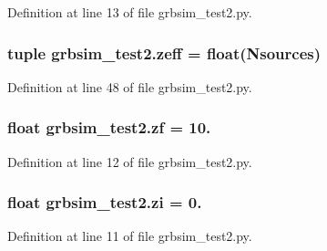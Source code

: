 Definition at line 13 of file grbsim\-\_\-test2.\-py.

\hypertarget{namespacegrbsim__test2_a13b835692fda0f61664fe2b3c0f326da}{
\subsubsection[{zeff}]{\setlength{\rightskip}{0pt plus 5cm}tuple grbsim\-\_\-test2.\-zeff = float({\bf Nsources})}}\label{namespacegrbsim__test2_a13b835692fda0f61664fe2b3c0f326da}


Definition at line 48 of file grbsim\-\_\-test2.\-py.

\hypertarget{namespacegrbsim__test2_a29713267fce8abc775a28c327915dede}{
\subsubsection[{zf}]{\setlength{\rightskip}{0pt plus 5cm}float grbsim\-\_\-test2.\-zf = 10.}}\label{namespacegrbsim__test2_a29713267fce8abc775a28c327915dede}


Definition at line 12 of file grbsim\-\_\-test2.\-py.

\hypertarget{namespacegrbsim__test2_a26f247fca7a995a7a7aa66713bf68ceb}{
\subsubsection[{zi}]{\setlength{\rightskip}{0pt plus 5cm}float grbsim\-\_\-test2.\-zi = 0.}}\label{namespacegrbsim__test2_a26f247fca7a995a7a7aa66713bf68ceb}


Definition at line 11 of file grbsim\-\_\-test2.\-py.

